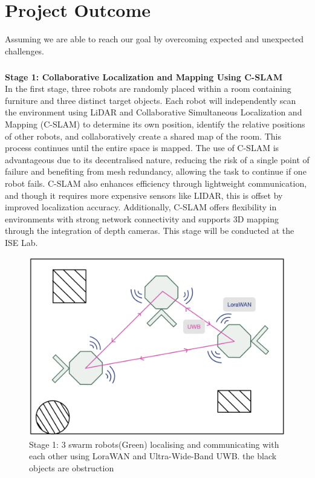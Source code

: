 \chapter{Project Outcome}

Assuming we are able to reach our goal by overcoming expected and unexpected challenges. 

\paragraph*{}
\textbf{Stage 1: Collaborative Localization and Mapping Using C-SLAM} \\
In the first stage, three robots are randomly placed within a room containing furniture and three distinct target objects. Each robot will independently scan the environment using LiDAR and Collaborative Simultaneous Localization and Mapping (C-SLAM) to determine its own position, identify the relative positions of other robots, and collaboratively create a shared map of the room. This process continues until the entire space is mapped. The use of C-SLAM is advantageous due to its decentralised nature, reducing the risk of a single point of failure and benefiting from mesh redundancy, allowing the task to continue if one robot fails. C-SLAM also enhances efficiency through lightweight communication, and though it requires more expensive sensors like LIDAR, this is offset by improved localization accuracy. Additionally, C-SLAM offers flexibility in environments with strong network connectivity and supports 3D mapping through the integration of depth cameras. This stage will be conducted at the ISE Lab.

\begin{figure}
    \centering
    \includegraphics[width=0.5\linewidth]{assets/images/project_outcome/stage_1.png}
    \caption{Stage 1: 3 swarm robots(Green) localising and communicating with each other using LoraWAN and Ultra-Wide-Band UWB. the black objects are obstruction}
    \label{fig:phase1}
\end{figure}

